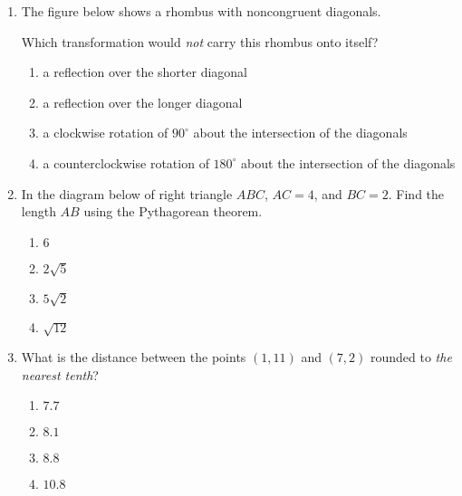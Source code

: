 \documentclass[12pt, twoside]{article}
\begin{document}
\begin{enumerate}
\item The figure below shows a rhombus with noncongruent diagonals.
  \begin{center}
  \end{center}
  Which transformation would \emph{not} carry this rhombus onto itself?
    \begin{enumerate}
      \item a reflection over the shorter diagonal
      \item a reflection over the longer diagonal
      \item a clockwise rotation of $90^\circ$ about the intersection of the
      diagonals
      \item a counterclockwise rotation of $180^\circ$ about the intersection of the
      diagonals
    \end{enumerate}
  
\newpage
\item In the diagram below of right triangle $ABC$, $AC=4$, and $BC=2$. Find the length $AB$ using the Pythagorean theorem.
  \begin{multicols}{2}
    \begin{enumerate}
      \item $6$
      \item $2\sqrt{5}$ 
      \item $5\sqrt{2}$
      \item $\sqrt{12}$ 
    \end{enumerate}
  \end{multicols}

\item What is the distance between the points $(1,11)$ and $(7,2)$ rounded to \emph{the nearest tenth}?
  \begin{multicols}{2}
    \begin{enumerate}
      \item $7.7$
      \item $8.1$ 
      \item $8.8$
      \item $10.8$
    \end{enumerate}
  \end{multicols} \vspace{1cm}


\end{enumerate}
\end{document}
